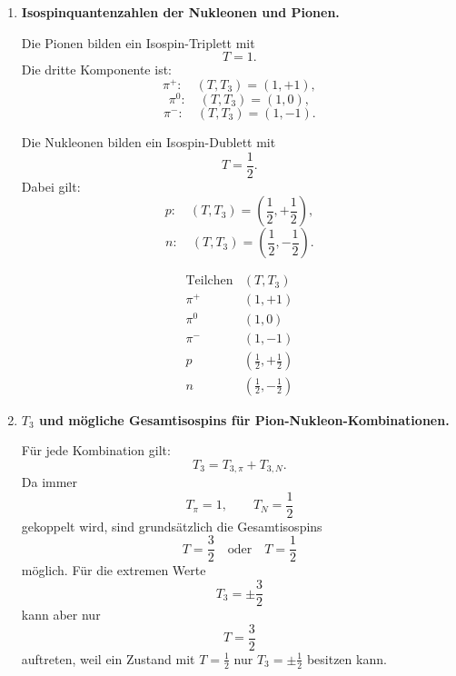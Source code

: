 \documentclass[11pt,a4paper]{scrartcl}
\theoremstyle{definition}
\theoremstyle{plain}
\theoremstyle{remark}
\begin{document}
\begin{enumerate}[label=(\alph*)]
    \item \textbf{Isospinquantenzahlen der Nukleonen und Pionen.}

    \begin{calculationbox}
        Die Pionen bilden ein Isospin-Triplett mit
        \[
            T=1.
        \]
        Die dritte Komponente ist:
        \[
            \pi^+:\quad (T,T_3)=(1,+1),
        \]
        \[
            \pi^0:\quad (T,T_3)=(1,0),
        \]
        \[
            \pi^-:\quad (T,T_3)=(1,-1).
        \]

        Die Nukleonen bilden ein Isospin-Dublett mit
        \[
            T=\frac12.
        \]
        Dabei gilt:
        \[
            p:\quad (T,T_3)=\left(\frac12,+\frac12\right),
        \]
        \[
            n:\quad (T,T_3)=\left(\frac12,-\frac12\right).
        \]
    \end{calculationbox}

    \begin{answerbox}
        \[
        \boxed{
        \begin{array}{c|c}
        \text{Teilchen} & (T,T_3)\\
        \hline
        \pi^+ & (1,+1)\\
        \pi^0 & (1,0)\\
        \pi^- & (1,-1)\\
        p & \left(\frac12,+\frac12\right)\\
        n & \left(\frac12,-\frac12\right)
        \end{array}}
        \]
    \end{answerbox}

    \item \textbf{$T_3$ und m\"ogliche Gesamtisospins f\"ur Pion-Nukleon-Kombinationen.}

    \begin{calculationbox}
        Für jede Kombination gilt:
        \[
            T_3=T_{3,\pi}+T_{3,N}.
        \]
        Da immer
        \[
            T_\pi=1,
            \qquad
            T_N=\frac12
        \]
        gekoppelt wird, sind grundsätzlich die Gesamtisospins
        \[
            T=\frac32
            \quad\text{oder}\quad
            T=\frac12
        \]
        möglich. Für die extremen Werte
        \[
            T_3=\pm\frac32
        \]
        kann aber nur
        \[
            T=\frac32
        \]
        auftreten, weil ein Zustand mit $T=\frac12$ nur $T_3=\pm\frac12$ besitzen kann.
    \end{calculationbox}


\end{enumerate}
\end{document}
